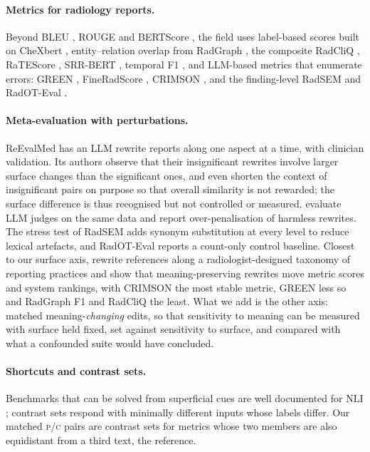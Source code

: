 \documentclass[11pt]{article}
\newcommand{\Pc}{\textsc{p}\xspace}
\newcommand{\Cc}{\textsc{c}\xspace}
\begin{document}
\paragraph{Metrics for radiology reports.}
Beyond BLEU \citep{papineni-etal-2002-bleu}, ROUGE \citep{lin-2004-rouge} and BERTScore \citep{zhang-etal-2020-bertscore}, the field uses label-based scores built on CheXbert \citep{smit-etal-2020-chexbert}, entity--relation overlap from RadGraph \citep{jain-etal-2021-radgraph}, the composite RadCliQ \citep{yu-etal-2023-evaluating}, RaTEScore \citep{zhao-etal-2024-ratescore}, SRR-BERT \citep{delbrouck-etal-2025-srr}, temporal F1 \citep{zhang-etal-2025-libra}, and LLM-based metrics that enumerate errors: GREEN \citep{ostmeier-etal-2024-green}, FineRadScore \citep{huang-etal-2024-fineradscore}, CRIMSON \citep{crimson-2026}, and the finding-level RadSEM \citep{radsem-2026} and RadOT-Eval \citep{radot-2026}.

\paragraph{Meta-evaluation with perturbations.}
ReEvalMed \citep{reevalmed-2025} has an LLM rewrite reports along one aspect at a time, with clinician validation. Its authors observe that their insignificant rewrites involve larger surface changes than the significant ones, and even shorten the context of insignificant pairs on purpose so that overall similarity is not rewarded; the surface difference is thus recognised but not controlled or measured. \citet{beyond-scalar-2026} evaluate LLM judges on the same data and report over-penalisation of harmless rewrites. The stress test of RadSEM adds synonym substitution at every level to reduce lexical artefacts, and RadOT-Eval reports a count-only control baseline. Closest to our surface axis, \citet{reref-2026} rewrite references along a radiologist-designed taxonomy of reporting practices and show that meaning-preserving rewrites move metric scores and system rankings, with CRIMSON the most stable metric, GREEN less so and RadGraph F1 and RadCliQ the least. What we add is the other axis: matched meaning-\emph{changing} edits, so that sensitivity to meaning can be measured with surface held fixed, set against sensitivity to surface, and compared with what a confounded suite would have concluded.

\paragraph{Shortcuts and contrast sets.}
Benchmarks that can be solved from superficial cues are well documented for NLI \citep{gururangan-etal-2018-annotation,mccoy-etal-2019-right}; contrast sets \citep{gardner-etal-2020-evaluating,kaushik-etal-2020-learning} respond with minimally different inputs whose labels differ. Our matched \Pc/\Cc pairs are contrast sets for metrics whose two members are also equidistant from a third text, the reference.
\end{document}
